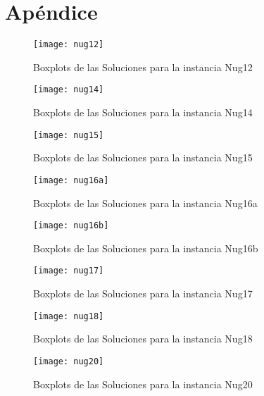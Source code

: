 \documentclass{ci5652}
\begin{document}
\newpage
\section*{Apéndice}

\begin{figure}[ht]
	\caption{Boxplots de las Soluciones para la instancia Nug12}
	\texttt{[image: nug12]}
    \centering
    \label{fig:boxplot_nug12}
\end{figure}

\begin{figure}[ht]
	\caption{Boxplots de las Soluciones para la instancia Nug14}
	\texttt{[image: nug14]}
    \centering
    \label{fig:boxplot_nug14}
\end{figure}

\begin{figure}[ht]
	\caption{Boxplots de las Soluciones para la instancia Nug15}
	\texttt{[image: nug15]}
    \centering
    \label{fig:boxplot_nug15}
\end{figure}

\begin{figure}[ht]
	\caption{Boxplots de las Soluciones para la instancia Nug16a}
	\texttt{[image: nug16a]}
    \centering
    \label{fig:boxplot_nug16a}
\end{figure}

\begin{figure}[ht]
	\caption{Boxplots de las Soluciones para la instancia Nug16b}
	\texttt{[image: nug16b]}
    \centering
    \label{fig:boxplot_nug16b}
\end{figure}

\begin{figure}[ht]
	\caption{Boxplots de las Soluciones para la instancia Nug17}
	\texttt{[image: nug17]}
    \centering
    \label{fig:boxplot_nug17}
\end{figure}

\begin{figure}[ht]
	\caption{Boxplots de las Soluciones para la instancia Nug18}
	\texttt{[image: nug18]}
    \centering
    \label{fig:boxplot_nug18}
\end{figure}

\begin{figure}[ht]
	\caption{Boxplots de las Soluciones para la instancia Nug20}
	\texttt{[image: nug20]}
    \centering
    \label{fig:boxplot_nug20}
\end{figure}
\end{document}
